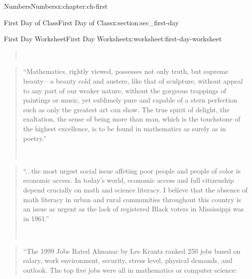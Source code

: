 \documentclass[twoside,10pt,]{book}
\numberwithin{equation}{chapter}
\begin{document}
\begin{chapterptx}{Numbers}{}{Numbers}{}{}{x:chapter:ch-first}
\begin{sectionptx}{First Day of Class}{}{First Day of Class}{}{}{x:section:sec_first-day}
\begin{worksheet-subsection}{First Day Worksheet}{}{First Day Worksheet}{}{}{x:worksheet:first-day-worksheet}
\begin{quote}
\nopagebreak\par%
\hfill{}\\\par
\end{quote}
\begin{quote}%
``Mathematics, rightly viewed, possesses not only truth, but supreme beauty—a beauty cold and austere, like that of sculpture, without appeal to any part of our weaker nature, without the gorgeous trappings of paintings or music, yet sublimely pure and capable of a stern perfection such as only the greatest art can show.  The true spirit of delight, the exaltation, the sense of being more than man, which is the touchstone of the highest excellence, is to be found in mathematics as surely as in poetry.''%
\nopagebreak\par%
\hfill{}\\\par
\end{quote}
\begin{quote}%
``...the most urgest social issue affeting poor people and people of color is economic access.  In today's world, economic access and full citizenship depend crucially on math and science literacy.  I believe that the absence of math literacy in urban and rural communities throughout this country is an issue as urgent as the lack of registered Black voters in Mississippi was in 1961.''%
\nopagebreak\par%
\hfill{}\\\par
\end{quote}
\begin{quote}%
``The 1999 Jobs Rated Almanac by Les Krantz ranked 250 jobs based on salary, work environment, security, stress level, physical demands, and outlook.  The top five jobs were all in mathematics or computer science: %
\begin{itemize}[label=\textbullet]

\end{itemize}
\end{quote}
\end{worksheet-subsection}
\end{sectionptx}
\end{chapterptx}
\end{document}
